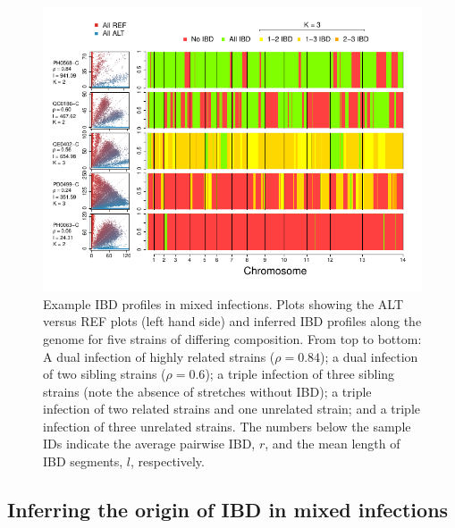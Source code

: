 \documentclass[9pt,lineno]{elife}
\begin{document}
\begin{figure}[ht]
  \begin{center}
  \includegraphics[width=.9\textwidth]{Fig5.pdf}
    \caption{Example IBD profiles in mixed infections. Plots showing the ALT versus REF plots (left hand side) and inferred IBD profiles along the genome for five strains of differing composition.  From top to bottom: A dual infection of highly related strains ($\rho = 0.84$); a dual infection of two sibling strains ($\rho = 0.6$); a triple infection of three sibling strains (note the absence of stretches without IBD); a triple infection of two related strains and one unrelated strain; and a triple infection of three unrelated strains.  The numbers below the sample IDs indicate the average pairwise IBD, $r$, and the mean length of IBD segments, $l$, respectively.}\label{fig:strainIBD}
    \end{center}
\end{figure}




\subsection{Inferring the origin of IBD in mixed infections}
\end{document}
